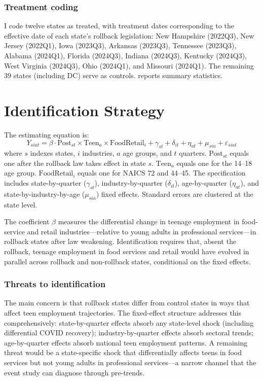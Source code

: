 \documentclass[12pt]{article}
\begin{document}
\subsubsection*{Treatment coding} I code twelve states as treated, with treatment dates corresponding to the effective date of each state's rollback legislation: New Hampshire (2022Q3), New Jersey (2022Q1), Iowa (2023Q3), Arkansas (2023Q3), Tennessee (2023Q3), Alabama (2024Q1), Florida (2024Q3), Indiana (2024Q3), Kentucky (2024Q3), West Virginia (2024Q3), Ohio (2024Q1), and Missouri (2024Q1). The remaining 39 states (including DC) serve as controls.  reports summary statistics.



\section{Identification Strategy}\label{sec:design}

The estimating equation is:
\begin{equation}
    Y_{siat} = \beta \cdot \text{Post}_{st} \times \text{Teen}_{a} \times \text{FoodRetail}_{i} + \gamma_{st} + \delta_{it} + \eta_{at} + \mu_{sia} + \varepsilon_{siat}
    \label{eq:ddd}
\end{equation}
where $s$ indexes states, $i$ industries, $a$ age groups, and $t$ quarters. $\text{Post}_{st}$ equals one after the rollback law takes effect in state $s$. $\text{Teen}_{a}$ equals one for the 14--18 age group. $\text{FoodRetail}_{i}$ equals one for NAICS 72 and 44--45. The specification includes state-by-quarter ($\gamma_{st}$), industry-by-quarter ($\delta_{it}$), age-by-quarter ($\eta_{at}$), and state-by-industry-by-age ($\mu_{sia}$) fixed effects. Standard errors are clustered at the state level.

The coefficient $\beta$ measures the differential change in teenage employment in food-service and retail industries---relative to young adults in professional services---in rollback states after law weakening. Identification requires that, absent the rollback, teenage employment in food services and retail would have evolved in parallel across rollback and non-rollback states, conditional on the fixed effects.

\subsubsection*{Threats to identification} The main concern is that rollback states differ from control states in ways that affect teen employment trajectories. The fixed-effect structure addresses this comprehensively: state-by-quarter effects absorb any state-level shock (including differential COVID recovery); industry-by-quarter effects absorb sectoral trends; age-by-quarter effects absorb national teen employment patterns. A remaining threat would be a state-specific shock that differentially affects teens in food services but not young adults in professional services---a narrow channel that the event study can diagnose through pre-trends.
\end{document}
